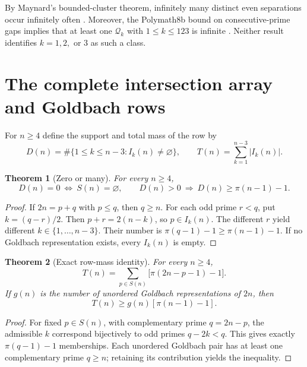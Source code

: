 \documentclass[11pt,a4paper]{article}
\newtheorem{theorem}{Theorem}[section]
\theoremstyle{definition}
\newcommand{\Qcal}{\mathcal Q}
\begin{document}
By Maynard's bounded-cluster theorem, infinitely many distinct even separations occur infinitely often \cite{Maynard2015}. Moreover, the Polymath8b bound on consecutive-prime gaps implies that at least one $\Qcal_k$ with $1\le k\le123$ is infinite \cite{Polymath2014}. Neither result identifies $k=1,2,$ or $3$ as such a class.

\section{The complete intersection array and Goldbach rows}
For $n\ge4$ define the support and total mass of the row by
\begin{equation}\label{eq:D-T}
 D(n)=\#\{1\le k\le n-3:I_k(n)\ne\varnothing\},\qquad
 T(n)=\sum_{k=1}^{n-3}|I_k(n)|.
\end{equation}

\begin{theorem}[Zero or many]\label{thm:zero-many}
For every $n\ge4$,
\begin{equation}\label{eq:zero-many}
 D(n)=0\ \Longleftrightarrow\ S(n)=\varnothing,
 \qquad D(n)>0\ \Longrightarrow\ D(n)\ge\pi(n-1)-1.
\end{equation}
\end{theorem}
\begin{proof}
If $2n=p+q$ with $p\le q$, then $q\ge n$. For each odd prime $r<q$, put $k=(q-r)/2$. Then $p+r=2(n-k)$, so $p\in I_k(n)$. The different $r$ yield different $k\in\{1,\ldots,n-3\}$. Their number is $\pi(q-1)-1\ge\pi(n-1)-1$. If no Goldbach representation exists, every $I_k(n)$ is empty.
\end{proof}

\begin{theorem}[Exact row-mass identity]\label{thm:rowmass}
For every $n\ge4$,
\begin{equation}\label{eq:rowmass}
 T(n)=\sum_{p\in S(n)}\bigl[\pi(2n-p-1)-1\bigr].
\end{equation}
If $g(n)$ is the number of unordered Goldbach representations of $2n$, then
\begin{equation}\label{eq:rowmassbound}
 T(n)\ge g(n)[\pi(n-1)-1].
\end{equation}
\end{theorem}
\begin{proof}
For fixed $p\in S(n)$, with complementary prime $q=2n-p$, the admissible $k$ correspond bijectively to odd primes $q-2k<q$. This gives exactly $\pi(q-1)-1$ memberships. Each unordered Goldbach pair has at least one complementary prime $q\ge n$; retaining its contribution yields the inequality.
\end{proof}
\end{document}
